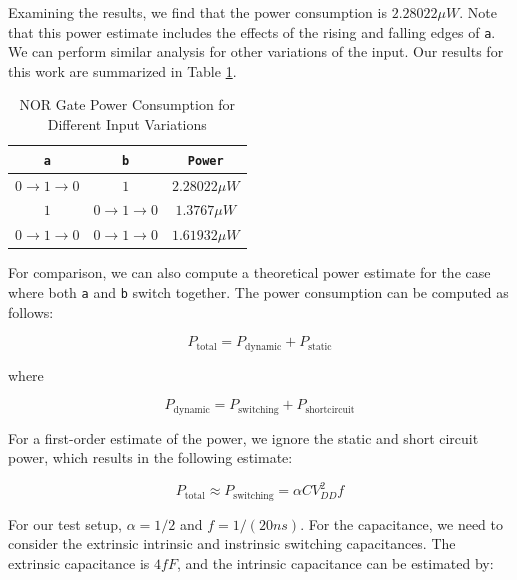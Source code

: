 \documentclass{article}
\begin{document}
	\noindent Examining the results, we find that the power consumption is $2.28022{\mu}W$. Note that this power estimate includes the effects of the rising and falling edges of \texttt{a}. We can perform similar analysis for other variations of the input. Our results for this work are summarized in Table \ref{table::nor_gate_power_analysis}.
	
	\begin{table}[H]
	\begin{center}
	\caption{NOR Gate Power Consumption for Different Input Variations}
	\label{table::nor_gate_power_analysis}
	\begin{tabular}{| c | c | c |}
		\hline
		\texttt{a} & \texttt{b} & \texttt{Power}\\
		\hline	
		$0 \rightarrow 1 \rightarrow 0$ & $1$ & $2.28022{\mu}W$ \\
		\hline	
		$1$ & $0 \rightarrow 1 \rightarrow 0$ & $1.3767{\mu}W$ \\
		\hline	
		$0 \rightarrow 1 \rightarrow 0$ & $0 \rightarrow 1 \rightarrow 0$ & $1.61932{\mu}W$\\
		\hline
	\end{tabular}
	\end{center}
	\end{table}
	
	For comparison, we can also compute a theoretical power estimate for the case where both \texttt{a} and \texttt{b} switch together. The power consumption can be computed as follows:
	
	\begin{equation}
		P_{\text{total}} = P_{\text{dynamic}} + P_{\text{static}}
	\end{equation}
	
	\noindent where
	
	\begin{equation}
		P_{\text{dynamic}} = P_{\text{switching}} +  P_{\text{shortcircuit}}
	\end{equation}
	
	\noindent For a first-order estimate of the power, we ignore the static and short circuit power, which results in the following estimate:
	
	\begin{equation}
		P_{\text{total}} \approx P_{\text{switching}} = \alpha CV_{DD}^2f
	\end{equation}
	
	\noindent For our test setup, $\alpha = 1/2$ and $f = 1/(20 ns)$. For the capacitance, we need to consider the extrinsic intrinsic and instrinsic switching capacitances. The extrinsic capacitance is $4 fF$, and the intrinsic capacitance can be estimated by:
	
\end{document}
